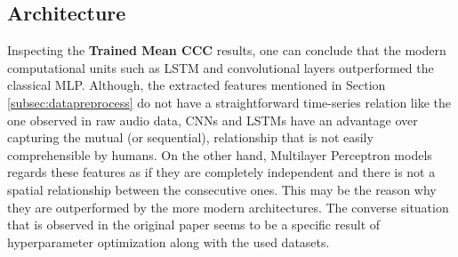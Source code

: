 \documentclass[a4paper,11pt]{article}
\begin{document}
\subsection{Architecture}
Inspecting the \textbf{Trained Mean CCC} results, one can conclude that the modern computational units such as LSTM and convolutional layers outperformed the classical MLP. Although, the extracted features mentioned in Section \ref{subsec:datapreprocess} do not have a straightforward time-series relation like the one observed in raw audio data, CNNs and LSTMs have an advantage over capturing the mutual (or sequential), relationship that is not easily comprehensible by humans. On the other hand, Multilayer Perceptron models regards these features as if they are completely independent and there is not a spatial relationship between the consecutive ones. This may be the reason why they are outperformed by the more modern architectures. The converse situation that is observed in the original paper seems to be a specific result of hyperparameter optimization along with the used datasets.


\pagebreak

\printbibliography
\end{document}
